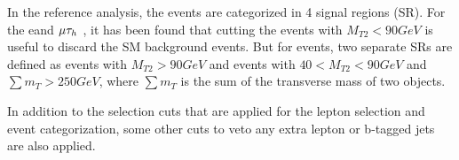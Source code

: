 In the reference analysis, the events are categorized in 4 signal regions (SR). For the e\Tau and $\mu\tau_h~$, it has been found that cutting the events with $M_{T2}<90 GeV$ is useful to discard the SM background events. But for \tauTau events, two separate SRs are defined as events with $M_{T2}>90 GeV$ and events with $40<M_{T2}<90 GeV$ and $\sum m_{T} > 250 GeV$, where $\sum m_{T}$ is the sum of the transverse mass of two \Tau objects.

In addition to the selection cuts that are applied for the lepton selection and event categorization, some other cuts to veto any extra lepton or b-tagged jets  are also applied. 

